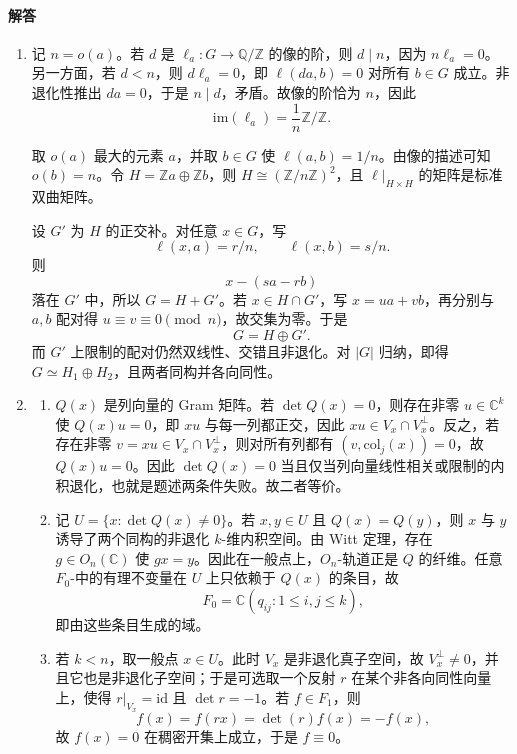 \documentclass[UTF8,12pt]{ctexart}
\begin{document}
\paragraph{解答}
\begin{enumerate}[label=\textbf{\arabic*.},leftmargin=2.2em]
\item 记 \(n=o(a)\)。若 \(d\) 是 \(\ell_a:G\to\mathbb Q/\mathbb Z\) 的像的阶，则 \(d\mid n\)，因为 \(n\ell_a=0\)。另一方面，若 \(d<n\)，则 \(d\ell_a=0\)，即 \(\ell(da,b)=0\) 对所有 \(b\in G\) 成立。非退化性推出 \(da=0\)，于是 \(n\mid d\)，矛盾。故像的阶恰为 \(n\)，因此
\[
\mathrm{im}(\ell_a)=\frac1n\mathbb Z/\mathbb Z.
\]

取 \(o(a)\) 最大的元素 \(a\)，并取 \(b\in G\) 使 \(\ell(a,b)=1/n\)。由像的描述可知 \(o(b)=n\)。令 \(H=\mathbb Za\oplus\mathbb Zb\)，则 \(H\cong (\mathbb Z/n\mathbb Z)^2\)，且 \(\ell|_{H\times H}\) 的矩阵是标准双曲矩阵。

设 \(G'\) 为 \(H\) 的正交补。对任意 \(x\in G\)，写
\[
\ell(x,a)=r/n,\qquad \ell(x,b)=s/n.
\]
则
\[
 x-(sa-rb)
\]
落在 \(G'\) 中，所以 \(G=H+G'\)。若 \(x\in H\cap G'\)，写 \(x=ua+vb\)，再分别与 \(a,b\) 配对得 \(u\equiv v\equiv0\pmod n\)，故交集为零。于是
\[
G=H\oplus G'.
\]
而 \(G'\) 上限制的配对仍然双线性、交错且非退化。对 \(|G|\) 归纳，即得 \(G\simeq H_1\oplus H_2\)，且两者同构并各向同性。

\item
\begin{enumerate}[label=\textbf{(\alph*)},leftmargin=2.4em]
\item \(Q(x)\) 是列向量的 Gram 矩阵。若 \(\det Q(x)=0\)，则存在非零 \(u\in\mathbb C^k\) 使 \(Q(x)u=0\)，即 \(x u\) 与每一列都正交，因此 \(xu\in V_x\cap V_x^\perp\)。反之，若存在非零 \(v=xu\in V_x\cap V_x^\perp\)，则对所有列都有 \((v,\mathrm{col}_j(x))=0\)，故 \(Q(x)u=0\)。因此 \(\det Q(x)=0\) 当且仅当列向量线性相关或限制的内积退化，也就是题述两条件失败。故二者等价。

\item 记 \(U=\{x:\det Q(x)\neq0\}\)。若 \(x,y\in U\) 且 \(Q(x)=Q(y)\)，则 \(x\) 与 \(y\) 诱导了两个同构的非退化 \(k\)-维内积空间。由 Witt 定理，存在 \(g\in O_n(\mathbb C)\) 使 \(gx=y\)。因此在一般点上，\(O_n\)-轨道正是 \(Q\) 的纤维。任意 \(F_0\)-中的有理不变量在 \(U\) 上只依赖于 \(Q(x)\) 的条目，故
\[
F_0=\mathbb C(q_{ij}:1\le i,j\le k),
\]
即由这些条目生成的域。

\item 若 \(k<n\)，取一般点 \(x\in U\)。此时 \(V_x\) 是非退化真子空间，故 \(V_x^\perp\neq0\)，并且它也是非退化子空间；于是可选取一个反射 \(r\) 在某个非各向同性向量上，使得 \(r|_{V_x}=\mathrm{id}\) 且 \(\det r=-1\)。若 \(f\in F_1\)，则
\[
 f(x)=f(rx)=\det(r)f(x)=-f(x),
\]
故 \(f(x)=0\) 在稠密开集上成立，于是 \(f\equiv0\)。


\end{enumerate}
\end{enumerate}
\end{document}

